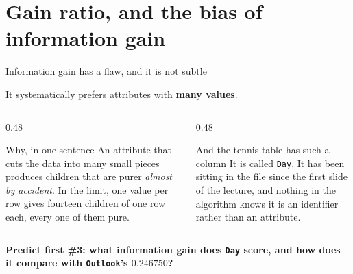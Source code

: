\documentclass[aspectratio=169]{beamer}
\begin{document}
\section[Ratio]{Gain ratio, and the bias of information gain}
\label{sec:gainratio}

\begin{frame}[shrink=5]{Information gain has a flaw, and it is not subtle}
  \begin{exampleblock}{}
    \centering\large
    It systematically prefers attributes with \textbf{many values}.
  \end{exampleblock}
  \vspace{0.3em}
  \begin{columns}[T]
    \begin{column}{0.48\textwidth}
      \begin{block}{Why, in one sentence}
        An attribute that cuts the data into many small pieces produces
        children that are purer \emph{almost by accident}. In the limit, one
        value per row gives fourteen children of one row each, every one of
        them pure.
      \end{block}
    \end{column}
    \begin{column}{0.48\textwidth}
      \begin{alertblock}{And the tennis table has such a column}
        It is called \texttt{Day}. It has been sitting in the file since the
        first slide of the lecture, and nothing in the algorithm knows it is
        an identifier rather than an attribute.
      \end{alertblock}
    \end{column}
  \end{columns}
  \vspace{0.3em}
  \begin{center}
    \textbf{Predict first \#3: what information gain does \texttt{Day} score,
    and how does it compare with \texttt{Outlook}'s $0.246750$?}
  \end{center}
\end{frame}
\end{document}
